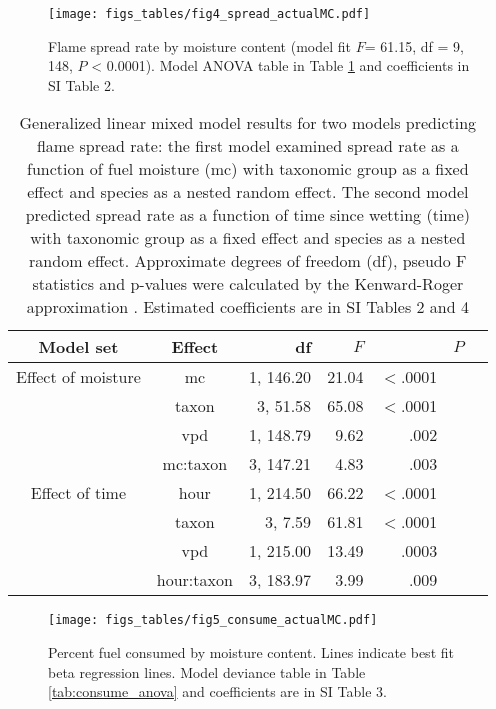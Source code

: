 \documentclass[fire,article,submit,moreauthors,pdftex]{Definitions/mdpi}
\begin{document}
\begin{figure}[H]
  \centering
\texttt{[image: figs\_tables/fig4\_spread\_actualMC.pdf]}
\caption{Flame spread rate by moisture content (model fit $F$= 61.15, df = 9, 148,  $P$ < 0.0001). Model ANOVA table in Table \ref{tab:spreadrate_anova} and coefficients in SI Table 2.}
  \label{fig:spread_moist}
\end{figure}

\begin{table}[H]
  \caption{Generalized linear mixed model results for two models predicting flame spread rate: the first model examined spread rate as a function of fuel moisture (mc) with taxonomic group as a fixed effect and species as a nested random effect. The second model predicted spread rate as a function of time since wetting (time) with taxonomic group as a fixed effect and species as a nested random effect. Approximate degrees of freedom (df), pseudo F statistics and p-values were calculated by the Kenward-Roger approximation \cite{Kenward_Roger-1997}. Estimated coefficients are in SI Tables 2 and 4}
  \label{tab:spreadrate_anova}
\centering
\begin{tabular}{ccrrrrr}
  \toprule
Model set & Effect & df & $F$ & & $P$ \\
  \midrule
  Effect of moisture & mc & 1, 146.20 & 21.04 & $<$.0001 \\ 
 &  taxon & 3, 51.58 & 65.08 & $<$.0001 \\ 
 & vpd & 1, 148.79 & 9.62 & .002 \\ 
 & mc:taxon & 3, 147.21 & 4.83 & .003 \\ 
   
  \midrule
  
  Effect of time & hour & 1, 214.50 & 66.22 & $<$.0001 \\ 
 &  taxon & 3, 7.59 & 61.81 & $<$.0001 \\ 
 & vpd & 1, 215.00 & 13.49 & .0003 \\ 
 & hour:taxon & 3, 183.97 & 3.99 & .009 \\ 

   \bottomrule

\end{tabular}
\end{table}


\begin{figure}[H]
  \centering
\texttt{[image: figs\_tables/fig5\_consume\_actualMC.pdf]}
\caption{Percent fuel consumed by moisture content. Lines indicate best fit beta regression lines. Model deviance table in Table \ref{tab:consume_anova} and coefficients are in SI Table 3.}
  \label{fig:consume_moist}
\end{figure}
\end{document}
